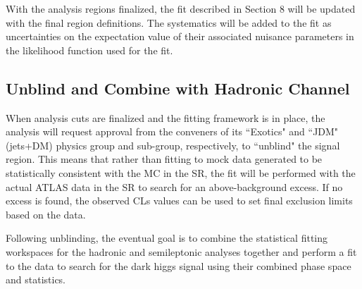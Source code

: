 \documentclass[12pt]{article}
\begin{document}
With the analysis regions finalized, the fit described in Section 8 will be updated with the final region definitions. The systematics will be added to the fit as uncertainties on the expectation value of their associated nuisance parameters in the likelihood function \cite{Baak:2014wma} used for the fit. 

\subsection{Unblind and Combine with Hadronic Channel}

When analysis cuts are finalized and the fitting framework is in place, the analysis will request approval from the conveners of its ``Exotics" and ``JDM" (jets+DM) physics group and sub-group, respectively, to ``unblind" the signal region. This means that rather than fitting to mock data generated to be statistically consistent with the MC in the SR, the fit will be performed with the actual ATLAS data in the SR to search for an above-background excess. If no excess is found, the observed CLs values can be used to set final exclusion limits based on the data.  

Following unblinding, the eventual goal is to combine the statistical fitting workspaces for the hadronic and semileptonic analyses together and perform a fit to the data to search for the dark higgs signal using their combined phase space and statistics. 

\newpage



\end{document}
